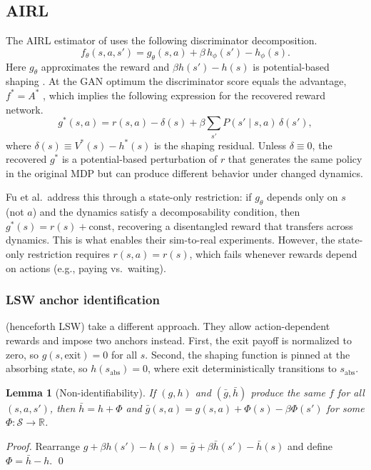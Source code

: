 \documentclass[11pt]{article}
\newtheorem{lemma}[theorem]{Lemma}
\begin{document}
\subsection{AIRL}

The AIRL estimator of \citet{fu2018} uses the following discriminator decomposition.
\begin{equation}\label{eq:decomp}
f_\theta(s,a,s') = g_\theta(s,a) + \beta\, h_\phi(s') - h_\phi(s).
\end{equation}
Here $g_\theta$ approximates the reward and $\beta h(s') - h(s)$ is potential-based shaping \citep{ng1999}. At the GAN optimum the discriminator score equals the advantage, $f^* = A^*$ \citep[Appendix A.4]{fu2018}, which implies the following expression for the recovered reward network.
\begin{equation}\label{eq:gstar}
g^*(s,a) = r(s,a) - \delta(s) + \beta \sum_{s'} P(s' \mid s,a)\,\delta(s'),
\end{equation}
where $\delta(s) \equiv V^*(s) - h^*(s)$ is the shaping residual. Unless $\delta \equiv 0$, the recovered $g^*$ is a potential-based perturbation of $r$ that generates the same policy in the original MDP but can produce different behavior under changed dynamics.

Fu et al.\ address this through a state-only restriction: if $g_\theta$ depends only on $s$ (not $a$) and the dynamics satisfy a decomposability condition, then $g^*(s) = r(s) + \text{const}$, recovering a disentangled reward that transfers across dynamics. This is what enables their sim-to-real experiments. However, the state-only restriction requires $r(s,a) = r(s)$, which fails whenever rewards depend on actions (e.g., paying vs.\ waiting).

\subsubsection{LSW anchor identification}

\citet{lee2026} (henceforth LSW) take a different approach. They allow action-dependent rewards and impose two anchors instead. First, the exit payoff is normalized to zero, so $g(s,\text{exit}) = 0$ for all $s$. Second, the shaping function is pinned at the absorbing state, so $h(s_{\mathrm{abs}}) = 0$, where exit deterministically transitions to $s_{\mathrm{abs}}$.

\begin{lemma}[Non-identifiability]\label{lem:nonid}
If $(g,h)$ and $(\bar{g},\bar{h})$ produce the same $f$ for all $(s,a,s')$, then $\bar{h} = h + \Phi$ and $\bar{g}(s,a) = g(s,a) + \Phi(s) - \beta\Phi(s')$ for some $\Phi : \mathcal{S} \to \mathbb{R}$.
\end{lemma}
\begin{proof}
Rearrange $g + \beta h(s') - h(s) = \bar{g} + \beta\bar{h}(s') - \bar{h}(s)$ and define $\Phi = \bar{h} - h$. \qed
\end{proof}
\end{document}
